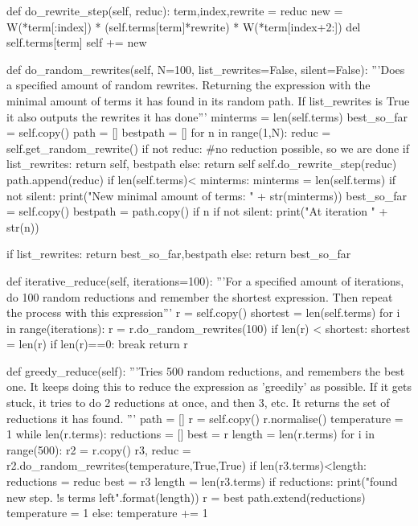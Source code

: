 \documentclass{article}
\begin{document}
\begin{python}
    def do_rewrite_step(self, reduc):
        term,index,rewrite = reduc
        new = W(*term[:index]) * (self.terms[term]*rewrite) * W(*term[index+2:])
        del self.terms[term]
        self += new

    def do_random_rewrites(self, N=100, list_rewrites=False, silent=False):
        '''Does a specified amount of random rewrites. Returning the expression
        with the minimal amount of terms it has found in its random path.
        If list_rewrites is True it also outputs the rewrites it has done'''
        minterms = len(self.terms)
        best_so_far = self.copy()
        path = []
        bestpath = []
        for n in range(1,N):
            reduc = self.get_random_rewrite()
            if not reduc: #no reduction possible, so we are done
                if list_rewrites: return self, bestpath
                else: return self
            self.do_rewrite_step(reduc)
            path.append(reduc)
            if len(self.terms)< minterms:
                minterms = len(self.terms)
                if not silent: print("New minimal amount of terms: " + str(minterms))
                best_so_far = self.copy()
                bestpath = path.copy()
            if n%
                if not silent: print("At iteration " + str(n))

        if list_rewrites: return best_so_far,bestpath
        else: return best_so_far
        
    def iterative_reduce(self, iterations=100):
        '''For a specified amount of iterations, do 100 random reductions and remember
         the shortest expression. Then repeat the process with this expression'''
        r = self.copy()
        shortest = len(self.terms)
        for i in range(iterations):
            r = r.do_random_rewrites(100)
            if len(r) < shortest:
                shortest = len(r)
                if len(r)==0: break
        return r

    def greedy_reduce(self):
        '''Tries 500 random reductions, and remembers the best one.
        It keeps doing this to reduce the expression as 'greedily' as possible.
        If it gets stuck, it tries to do 2 reductions at once, and then 3, etc.
        It returns the set of reductions it has found.
        '''
        path = []
        r = self.copy()
        r.normalise()
        temperature = 1
        while len(r.terms):
            reductions = []
            best = r
            length = len(r.terms)
            for i in range(500):
                r2 = r.copy()
                r3, reduc = r2.do_random_rewrites(temperature,True,True)
                if len(r3.terms)<length:
                    reductions = reduc
                    best = r3
                    length = len(r3.terms)
            if reductions:
                print("found new step. {!s} terms left".format(length))
                r = best
                path.extend(reductions)
                temperature = 1
            else:
                temperature += 1
            

\end{python}
\end{document}
